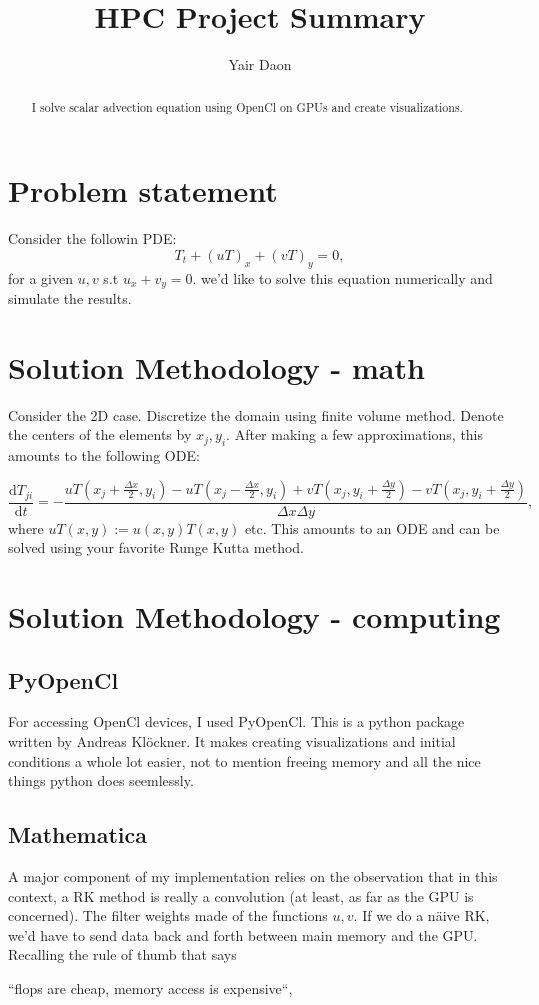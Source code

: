 \documentclass[paper=a4, fontsize=11pt]{scrartcl} %
\title{HPC Project Summary}
\author{Yair Daon}
\date{}
\numberwithin{equation}{section} %
\numberwithin{figure}{section} %
\numberwithin{table}{section} %
\newcommand{\dd}{\text{d}}
\begin{document}
\maketitle
\begin{abstract}
I solve scalar advection equation using OpenCl on GPUs and create visualizations.
\end{abstract}
\section{Problem statement}
Consider the followin PDE:
$$
T_{t} + (uT)_x + (vT)_y = 0,
$$
for a given $u,v$ s.t $u_x + v_y = 0$.
we'd like to solve this equation numerically and simulate the results.


\section{Solution Methodology - math}
Consider the 2D case.
 Discretize the domain using finite volume method. 
Denote the centers of the elements by $x_j, y_i$. 
After making a few approximations, this amounts to the following ODE:

$$
\frac{\dd T_{ji}}{\dd t} = -\frac{uT(x_j + \frac{\Delta x}{2},y_i) - uT(x_j - \frac{\Delta x}{2},y_i) +
				  vT(x_j,y_i + \frac{\Delta y}{2}) - vT(x_j,y_i + \frac{\Delta y}{2}) }{\Delta x\Delta y},
$$
where $uT(x,y) := u(x,y)T(x,y)$ etc.
This amounts to an ODE and can be solved using your favorite Runge Kutta method.

\section{Solution Methodology - computing}

\subsection{PyOpenCl}
For accessing OpenCl devices, I used PyOpenCl. This is a python package written by Andreas Kl\"ockner. 
It makes creating visualizations and initial conditions a whole lot easier, not to 
mention freeing memory and all the nice things python does seemlessly.

\subsection{Mathematica} 
A major component of my implementation relies on the observation that in this context, a RK method is really a convolution
 (at least, as far as the GPU is concerned). The filter weights made of the functions $u,v$. If we do a n\"aive RK, we'd have to
send data back and forth between main memory and the GPU. Recalling the rule of thumb that says 
\\
\centerline{\Large{``flops are cheap, memory access is expensive``},}
\\
\end{document}
